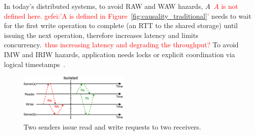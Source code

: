 In today's distributed systems, to avoid RAW and WAW hazards, $A$~\textcolor{red}{$A$ is not defined here. gefei:'A is defined in Figure~\ref{fig:causality_traditional}'} needs to wait for the first write operation to complete (an RTT to the shared storage) until issuing the next operation, therefore increases latency and limits concurrency.~\textcolor{red}{thus increasing latency and degrading the throughput?}
To avoid IMW and IRIW hazards, application needs locks or explicit coordination via logical timestamps~\cite{lamport1978time}.

\iffalse
\begin{figure}[t]
\centering
\includegraphics[width=0.48\textwidth]{images/read_write_isolation.pdf}
\caption{Two senders issue read and write requests to two receivers.}
\label{fig:example}
\end{figure}



